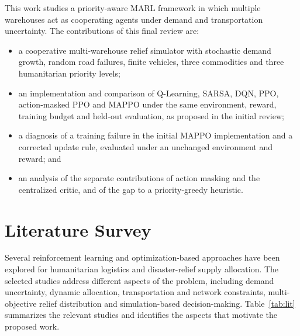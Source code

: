 \documentclass[conference]{IEEEtran}
\begin{document}
This work studies a priority-aware MARL framework in which multiple warehouses act as cooperating agents under demand and transportation uncertainty. The contributions of this final review are:
\begin{itemize}
\item a cooperative multi-warehouse relief simulator with stochastic demand growth, random road failures, finite vehicles, three commodities and three humanitarian priority levels;
\item an implementation and comparison of Q-Learning, SARSA, DQN, PPO, action-masked PPO and MAPPO under the same environment, reward, training budget and held-out evaluation, as proposed in the initial review;
\item a diagnosis of a training failure in the initial MAPPO implementation and a corrected update rule, evaluated under an unchanged environment and reward; and
\item an analysis of the separate contributions of action masking and the centralized critic, and of the gap to a priority-greedy heuristic.
\end{itemize}


\section{Literature Survey}
Several reinforcement learning and optimization-based approaches have been explored for humanitarian logistics and disaster-relief supply allocation. The selected studies address different aspects of the problem, including demand uncertainty, dynamic allocation, transportation and network constraints, multi-objective relief distribution and simulation-based decision-making. Table~\ref{tab:lit} summarizes the relevant studies and identifies the aspects that motivate the proposed work.
\end{document}
